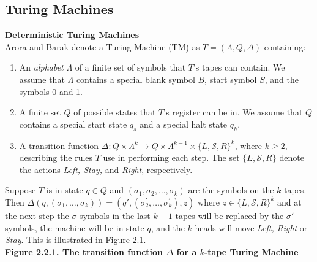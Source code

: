 \documentclass[11pt]{article}
\begin{document}
\subsection{Turing Machines} 

\textbf{Deterministic Turing Machines} \\
 Arora and Barak denote a Turing Machine (TM) as $ T = (\Lambda, Q, \Delta) $ containing:
\begin{enumerate}
\item An \textit{alphabet} $ \Lambda $ of a finite set of symbols that $ T $'s tapes can contain. We assume that $ \Lambda $ contains a special blank symbol $ B $, start symbol $ S $, and the symbols 0 and 1. 
\item A finite set $ Q $ of possible states that $ T $'s register can be in. We assume that $ Q $ contains a special start state $ q_{s} $ and a special halt state $ q_{h} $. 
\item A transition function $ \Delta : Q \times \Lambda^{k} \rightarrow Q \times \Lambda^{k - 1} \times \{L, \mathcal{S}, R\}^{k} $, where $ k \geq 2$, describing the rules $ T $ use in performing each step. The set $\{L, \mathcal{S}, R\}$ denote the actions \textit{Left, Stay,} and \textit{Right}, respectively. 
\end{enumerate}

Suppose $ T $ is in state $ q \in Q $ and $ (\sigma_1, \sigma_2, \dots, \sigma_k) $ are the symbols on the $ k $ tapes. Then $ \Delta(q, (\sigma_1, \dots, \sigma_k)) = (q', (\sigma_{2}^{'}, \dots, \sigma_{k}^{'}), z) $ where $ z \in \{L, \mathcal{S}, R\}^k $ and at the next step the $ \sigma $ symbols in the last $ k - 1 $ tapes will be replaced by the $ \sigma' $ symbols, the machine will be in state $ q $, and the $ k $ heads will move \textit{Left, Right} or \textit{Stay}. This is illustrated in Figure 2.1. \\

\textbf{Figure 2.2.1. The transition function $ \Delta $ for a $ k $-tape Turing Machine}
\end{document}

